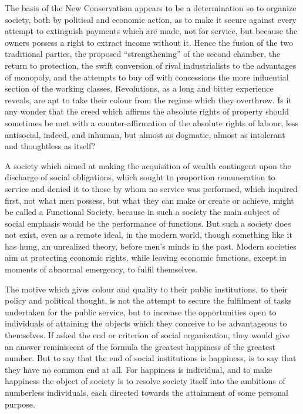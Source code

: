 \documentclass{book}
\begin{document}
The basis of the New Conservatism appears to be a determination so to organize society, both by political and economic action, as to make it secure against every attempt to extinguish payments which are made, not for service, but because the owners possess a right to extract income without it. Hence the fusion of the two traditional parties, the proposed “strengthening” of the second chamber, the return to protection, the swift conversion of rival industrialists to the advantages of monopoly, and the attempts to buy off with concessions the more influential section of the working classes. Revolutions, as a long and bitter experience reveals, are apt to take their colour from the regime which they overthrow. Is it any wonder that the creed which affirms the absolute rights of property should sometimes be met with a counter-affirmation of the absolute rights of labour, less antisocial, indeed, and inhuman, but almost as dogmatic, almost as intolerant and thoughtless as itself?

A society which aimed at making the acquisition of wealth contingent upon the discharge of social obligations, which sought to proportion remuneration to service and denied it to those by whom no service was performed, which inquired first, not what men possess, but what they can make or create or achieve, might be called a Functional Society, because in such a society the main subject of social emphasis would be the performance of functions. But such a society does not exist, even as a remote ideal, in the modern world, though something like it has hung, an unrealized theory, before men’s minds in the past. Modern societies aim at protecting economic rights, while leaving economic functions, except in moments of abnormal emergency, to fulfil themselves.

The motive which gives colour and quality to their public institutions, to their policy and political thought, is not the attempt to secure the fulfilment of tasks undertaken for the public service, but to increase the opportunities open to individuals of attaining the objects which they conceive to be advantageous to themselves. If asked the end or criterion of social organization, they would give an answer reminiscent of the formula the greatest happiness of the greatest number. But to say that the end of social institutions is happiness, is to say that they have no common end at all. For happiness is individual, and to make happiness the object of society is to resolve society itself into the ambitions of numberless individuals, each directed towards the attainment of some personal purpose.
\end{document}
